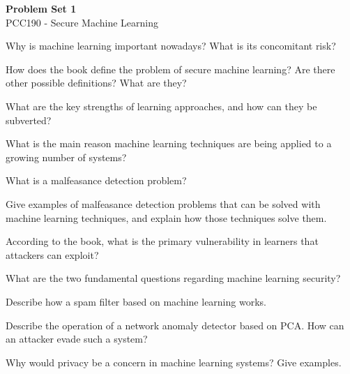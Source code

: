 \documentclass[10pt]{extarticle}
\begin{document}
\begin{center}
    {\LARGE\bfseries\color{darkblue}Problem Set 1}\\[0.3cm]
    {\large\color{accentorange} PCC190 - Secure Machine Learning}\\[0.5cm]
\end{center}


\begin{questoes}

\item Why is machine learning important nowadays? What is its concomitant risk?

\item How does the book define the problem of secure machine learning? Are there other possible definitions? What are they?

\item What are the key strengths of learning approaches, and how can they be subverted?

\item What is the main reason machine learning techniques are being applied to a growing number of systems?

\item What is a malfeasance detection problem?

\item Give examples of malfeasance detection problems that can be solved with machine learning techniques, and explain how those techniques solve them.

\item According to the book, what is the primary vulnerability in learners that attackers can exploit?

\item What are the two fundamental questions regarding machine learning security?

\item Describe how a spam filter based on machine learning works.

\item Describe the operation of a network anomaly detector based on PCA. How can an attacker evade such a system?

\item Why would privacy be a concern in machine learning systems? Give examples.


\end{questoes}
\end{document}
